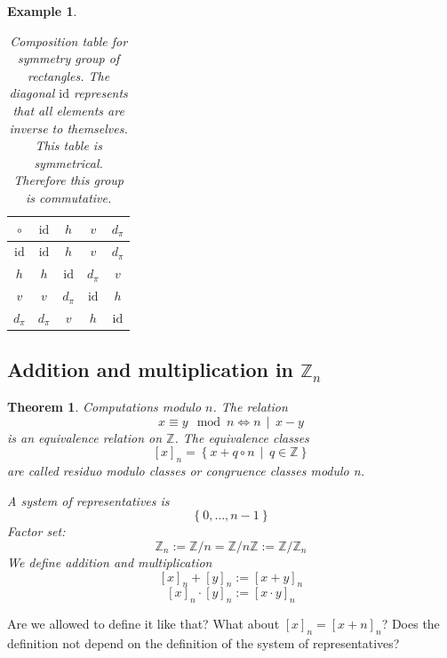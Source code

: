 \documentclass[a4paper,landscape,twocolumn]{article}
\newcommand\set[1]{\left\{#1\right\}}
\newcommand\setdef[2]{\left\{#1\,\middle|\,#2\right\}}
\newcommand\divides[2]{#1\,\mid\,#2}
\newtheorem{theorem}{Theorem}[section]
\newtheorem{ex}{Example}[section]
\begin{document}
\begin{ex}
  \begin{table}[!ht]
    \begin{center}
      \begin{tabular}{c|cccc}
       \hline \hline
        $\circ     $ & $\text{id} $ & $h        $ & $v        $ & $d_\pi    $ \\
       \hline
        $\text{id} $ & $\text{id} $ & $h        $ & $v        $ & $d_\pi    $ \\
        $h         $ & $h         $ & $\text{id}$ & $d_\pi    $ & $v        $ \\
        $v         $ & $v         $ & $d_\pi    $ & $\text{id}$ & $h        $ \\
        $d_\pi     $ & $d_\pi     $ & $v        $ & $h        $ & $\text{id}$ \\
       \hline \hline
      \end{tabular}
      \caption{
        Composition table for symmetry group of rectangles.
        The diagonal $\text{id}$ represents that all elements are inverse to themselves.
        This table is symmetrical. Therefore this group is commutative.
      }
    \end{center}
  \end{table}
\end{ex}

\subsection{Addition and multiplication in $\mathbb Z_n$}

\begin{theorem}
  \label{2.15}
  Computations modulo $n$. The relation
  \[ x \equiv y \mod{n} \iff \divides{n}{x - y} \]
  is an equivalence relation on $\mathbb{Z}$.
  The equivalence classes
  \[ [x]_n = \setdef{x + q \circ n}{q \in \mathbb{Z}} \]
  are called \emph{residuo modulo classes} or \emph{congruence classes modulo n}.

  A system of representatives is
  \[ \set{0, \ldots, n-1} \]
  Factor set:
  \[ \mathbb{Z}_n := \mathbb{Z}/n = \mathbb{Z}/n\mathbb{Z} := \mathbb{Z}/\mathbb{Z}_n \]
  We define addition and multiplication
  \[ [x]_n + [y]_n := [x + y]_n \]
  \[ [x]_n \cdot [y]_n := [x \cdot y]_n \]
\end{theorem}

Are we allowed to define it like that?
What about $[x]_n = [x + n]_n$?
Does the definition not depend on the definition of the system of representatives?
\end{document}
